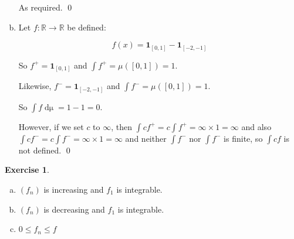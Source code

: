 \documentclass[11pt,oneside]{article}
\numberwithin{equation}{section}
\theoremstyle{definition}
\newtheorem{exercise}{Exercise}
\def\RR{\mathbb{R}}
\def\one{\mathbf{1}}
\begin{document}
\begin{solution}
\begin{enumerate}[(a)]
    As required.  \qed  
    
    
  \item
    Let $f : \RR \to \RR$ be defined:
    
    \[
    f(x) =  \one_{[0, 1]} - \one_{[-2, -1]}
    \]
    
    So $f^+ =  \one_{[0, 1]}$ and $\int f^+ = \mu([0,1]) = 1$.
    
    Likewise, $f^- =  \one_{[-2, -1]}$ and $\int f^- = \mu([0,1]) = 1$.
    
    So $\int f \mathop{d \mu} = 1 - 1 = 0$.
    
    However, if we set $c$ to $\infty$, then $ \int c f^+ = c \int f^+ = \infty \times 1 = \infty$ and
    also  $ \int c f^- = c \int f^- = \infty \times 1 = \infty$ and neither $\int f^-$ nor $\int f^-$ is finite, so
    $\int c f$ is not defined.  
    \qed
    
  \end{enumerate}
  
\end{solution}

\begin{exercise}
  
  \begin{enumerate}[(a)]
  \item
    $(f_n) $ is increasing and $f_1$ is integrable.
  \item
    $(f_n) $ is decreasing  and $f_1$ is integrable.
  \item
    $ 0 \leq f_n \leq f$
  \end{enumerate}
  
\end{exercise}
\end{document}
